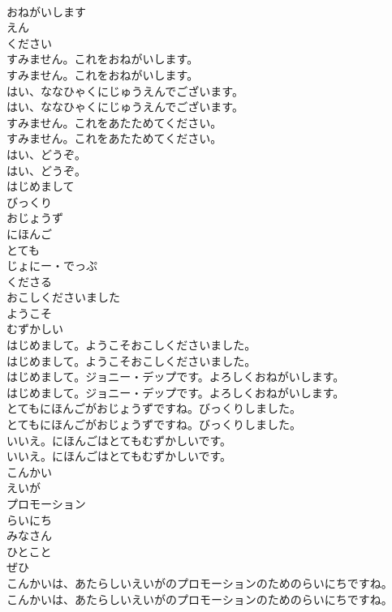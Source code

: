 \documentclass[8pt]{extreport}
\begin{document}
\begin{CJK}{UTF8}{min}
\\	おねがいします
\\	えん
\\	ください
\\	すみません。これをおねがいします。	
\\	すみません。これをおねがいします。 
\\	はい、ななひゃくにじゅうえんでございます。	
\\	はい、ななひゃくにじゅうえんでございます。 
\\	すみません。これをあたためてください。	
\\	すみません。これをあたためてください。 
\\	はい、どうぞ。	
\\	はい、どうぞ。 
\\	はじめまして
\\	びっくり
\\	おじょうず
\\	にほんご
\\	とても
\\	じょにー・でっぷ
\\	くださる
\\	おこしくださいました
\\	ようこそ
\\	むずかしい
\\	はじめまして。ようこそおこしくださいました。	
\\	はじめまして。ようこそおこしくださいました。 
\\	はじめまして。ジョニー・デップです。よろしくおねがいします。	
\\	はじめまして。ジョニー・デップです。よろしくおねがいします。 
\\	とてもにほんごがおじょうずですね。びっくりしました。	
\\	とてもにほんごがおじょうずですね。びっくりしました。 
\\	いいえ。にほんごはとてもむずかしいです。	
\\	いいえ。にほんごはとてもむずかしいです。 
\\	こんかい
\\	えいが
\\	プロモーション
\\	らいにち
\\	みなさん
\\	ひとこと
\\	ぜひ
\\	こんかいは、あたらしいえいがのプロモーションのためのらいにちですね。	
\\	こんかいは、あたらしいえいがのプロモーションのためのらいにちですね。 

\end{CJK}
\end{document}
